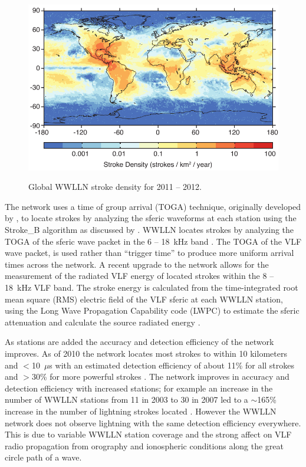 \begin{figure}[ht!]
	\centering
	\includegraphics[scale=1]{Introduction/Figures/wwlln_density.pdf}\\
	\caption{Global WWLLN stroke density for 2011 -- 2012.}
	\label{intro:fig:wwlln}
\end{figure}

The network uses a time of group arrival (TOGA) technique, originally developed by \citet{Dowden2002d}, to locate strokes by analyzing the sferic waveforms at each station using the Stroke\_B algorithm as discussed by \citet{Rodger2006,Rodger2009}.
WWLLN locates strokes by analyzing the TOGA of the sferic wave packet in the 6 -- 18~kHz band \citep{Dowden2000}.
The TOGA of the VLF wave packet, is used rather than ``trigger time'' to produce more uniform arrival times across the network.
A recent upgrade to the network allows for the measurement of the radiated VLF energy of located strokes within the 8 -- 18~kHz VLF band.
The stroke energy is calculated from the time-integrated root mean square (RMS) electric field of the VLF sferic at each WWLLN station, using the Long Wave Propagation Capability code (LWPC) \citep{Ferguson1998} to estimate the sferic attenuation and calculate the source radiated energy \citep{Hutchins2012}.

As stations are added the accuracy and detection efficiency of the network improves.
As of 2010 the network locates most strokes to within 10 kilometers and $<$10~$\mu$s with an estimated detection efficiency of about 11\% for all strokes and $>$30\% for more powerful strokes \citep{Abarca2010,Rodger2009}.
The network improves in accuracy and detection efficiency with increased stations; for example an increase in the number of WWLLN stations from 11 in 2003 to 30 in 2007 led to a $\sim$165\% increase in the number of lightning strokes located \citep{Rodger2009}.
However the WWLLN network does not observe lightning with the same detection efficiency everywhere.
This is due to variable WWLLN station coverage and the strong affect on VLF radio propagation from orography and ionospheric conditions along the great circle path of a wave.


